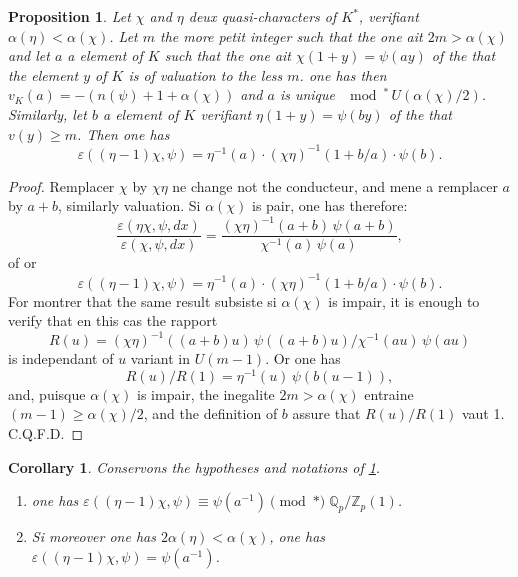 \documentclass[12pt,a4paper]{article}
\theoremstyle{plain}
\newtheorem{proposition}[theorem]{Proposition}
\newtheorem{corollary}[theorem]{Corollary}
\theoremstyle{definition}
\theoremstyle{remark}
\newcommand{\bQ}{\mathbb{Q}}
\newcommand{\bZ}{\mathbb{Z}}
\begin{document}
\begin{proposition}\label{prop:1.1}
Let $\chi$ and $\eta$ deux quasi-characters of $K^*$, verifiant $\alpha(\eta) < \alpha(\chi)$. Let $m$ the more petit integer such that the one ait $2m > \alpha(\chi)$ and let $a$ a element of $K$ such that the one ait $\chi(1+y) = \psi(ay)$ of the that the element $y$ of $K$ is of valuation to the less $m$. one has then $v_K(a) = -(n(\psi) + 1 + \alpha(\chi))$ and $a$ is unique $\mod^*\, U(\alpha(\chi)/2)$. Similarly, let $b$ a element of $K$ verifiant $\eta(1+y) = \psi(by)$ of the that $v(y) \geq m$. Then one has
\begin{equation}\label{eq:1.1.1}
\varepsilon((\eta-1)\chi, \psi) = \eta^{-1}(a) \cdot (\chi\eta)^{-1}(1+b/a) \cdot \psi(b).
\end{equation}
\end{proposition}

\begin{proof}
Remplacer $\chi$ by $\chi\eta$ ne change not the conducteur, and mene a remplacer $a$ by $a+b$, similarly valuation. Si $\alpha(\chi)$ is pair, one has therefore:
\[
\frac{\varepsilon(\eta\chi, \psi, dx)}{\varepsilon(\chi, \psi, dx)} = \frac{(\chi\eta)^{-1}(a+b) \, \psi(a+b)}{\chi^{-1}(a) \, \psi(a)},
\]
of or
\[
\varepsilon((\eta-1)\chi, \psi) = \eta^{-1}(a) \cdot (\chi\eta)^{-1}(1+b/a) \cdot \psi(b).
\]
For montrer that the same result subsiste si $\alpha(\chi)$ is impair, it is enough to verify that en this cas the rapport
\[
R(u) = (\chi\eta)^{-1}((a+b)u) \, \psi((a+b)u) \big/ \chi^{-1}(au) \, \psi(au)
\]
is independant of $u$ variant in $U(m-1)$. Or one has
\[
R(u)/R(1) = \eta^{-1}(u) \, \psi(b(u-1)),
\]
and, puisque $\alpha(\chi)$ is impair, the inegalite $2m > \alpha(\chi)$ entraine $(m-1) \geq \alpha(\chi)/2$, and the definition of $b$ assure that $R(u)/R(1)$ vaut 1. C.Q.F.D.
\end{proof}

\begin{corollary}\label{cor:1.3}
Conservons the hypotheses and notations of \ref{prop:1.1}.
\begin{enumerate}[label=(\roman*)]
\item one has $\varepsilon((\eta-1)\chi, \psi) \equiv \psi(a^{-1}) \pmod{*} \;\bQ_p/\bZ_p(1)$.
\item Si moreover one has $2\alpha(\eta) < \alpha(\chi)$, one has $\varepsilon((\eta-1)\chi, \psi) = \psi(a^{-1})$.
\end{enumerate}
\end{corollary}
\end{document}
